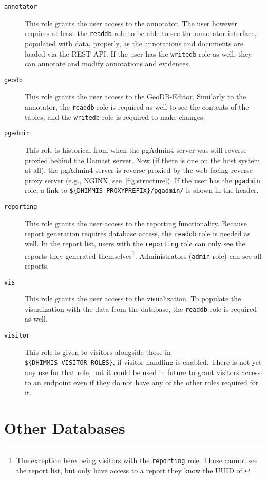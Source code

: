 \begin{description}
  \item[\texttt{annotator}]
    This role grants the user access to the annotator.
    The user however requires at least the \verb!readdb! role to be able to see the annotator interface, populated with data, properly, as the annotations and documents are loaded via the REST API.
    If the user has the \verb!writedb! role as well, they can annotate and modify annotations and evidences.
  \item[\texttt{geodb}]
    This role grants the user access to the GeoDB-Editor.
    Similarly to the annotator, the \verb!readdb! role is required as well to see the contents of the tables, and the \verb!writedb! role is required to make changes.
  \item[\texttt{pgadmin}]
    This role is historical from when the pgAdmin4 server was still reverse-proxied behind the Damast server.
    Now (if there is one on the host system at all), the pgAdmin4 server is reverse-proxied by the web-facing reverse proxy server (e.g., NGINX, see~\cref{fig:structure}).
    If the user has the \verb!pgadmin! role, a link to \verb!${DHIMMIS_PROXYPREFIX}/pgadmin/! is shown in the header.
  \item[\texttt{reporting}]
    This role grants the user access to the reporting functionality.
    Because report generation requires database access, the \verb!readdb! role is needed as well.
    In the report list, users with the \verb!reporting! role can only see the reports they generated themselves\footnote{%
      The exception here being visitors with the \texttt{reporting} role.
      Those cannot see the report list, but only have access to a report they know the UUID of.
    }.
    Administrators (\verb!admin! role) can see all reports.
  \item[\texttt{vis}]
    This role grants the user access to the visualization.
    To populate the visualization with the data from the database, the \verb!readdb! role is required as well.
  \item[\texttt{visitor}]
    This role is given to visitors alongside those in \verb!${DHIMMIS_VISITOR_ROLES}!, if visitor handling is enabled.
    There is not yet any use for that role, but it could be used in future to grant visitors access to an endpoint even if they do not have any of the other roles required for it.
\end{description}


\section{Other Databases}

